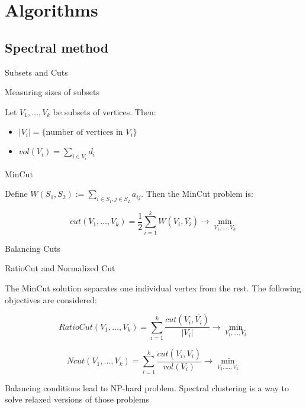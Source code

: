 \documentclass{beamer}
\theoremstyle{definition}
\theoremstyle{plain}
\theoremstyle{remark}
\begin{document}
	\section{Algorithms}
		\subsection{Spectral method}
			\begin{frame}{Subsets and Cuts}

\begin{block}{Measuring sizes of subsets}

Let $V_{1},\dots,V_{k}$ be subsets of vertices. Then:

\begin{itemize}

\item $|V_{i}| = \{\text{number of vertices in $V_{i}$}\}$

\item $vol(V_{i}) = \sum \limits_{i \in V_{i}}d_{i}$

\end{itemize}

\end{block}

\begin{block}{MinCut}

Define $W(S_1,S_2):= \sum \limits_{i \in S_1,j \in S_2}  a_{ij}.$ Then the MinCut problem is:

\[
cut(V_1,\dots,V_k) = \frac{1}{2}\sum\limits_{i=1}^kW(V_i,\overline{V_i}) \rightarrow \min \limits_{V_1,\dots,V_k}
\]
\end{block}

\end{frame}		

\begin{frame}{Balancing Cuts}

\begin{block}{RatioCut and Normalized Cut}

The MinCut solution separates one individual vertex from the rest. The following objectives are considered:

\[
RatioCut(V_1,\dots,V_k) = \sum \limits_{i=1}^k \frac{cut(V_i,\overline{V_i})}{|V_{i}|} \rightarrow \min \limits_{V_1,\dots,V_k}
\]

\[
Ncut(V_1,\dots,V_k)= \sum \limits_{i=1}^k \frac{cut(V_i,\overline{V_i})}{vol(V_{i})} \rightarrow \min \limits_{V_1,\dots,V_k}
\]

\end{block}

Balancing conditions lead to NP-hard problem. Spectral clustering is a way to solve relaxed versions of those problems

\end{frame}
\end{document}
